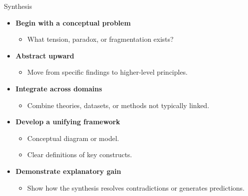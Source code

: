 \documentclass{beamer}
\begin{document}
\begin{frame}{Synthesis}
\fontsize{9pt}{10pt}\selectfont

\begin{itemize}
    \item \textbf{Begin with a conceptual problem }
    \begin{itemize}
        \item What tension, paradox, or fragmentation exists?
    \end{itemize}
    \item \textbf{Abstract upward }
    \begin{itemize}
        \item Move from specific findings to higher-level principles.
    \end{itemize}
    \item \textbf{Integrate across domains }
    \begin{itemize}
        \item Combine theories, datasets, or methods not typically linked.
    \end{itemize}
    \item \textbf{Develop a unifying framework }
    \begin{itemize}
        \item Conceptual diagram or model.
        \item Clear definitions of key constructs.
    \end{itemize}
    \item \textbf{Demonstrate explanatory gain }
    \begin{itemize}
        \item Show how the synthesis resolves contradictions or generates predictions.
    \end{itemize}
\end{itemize}

\end{frame}
\end{document}

